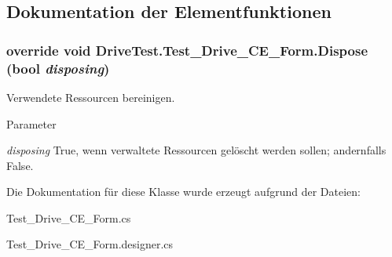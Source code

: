 \subsection{Dokumentation der Elementfunktionen}
\hypertarget{class_drive_test_1_1_test___drive___c_e___form_a584a1f5c6af489c5e76db7246edc3d7b}{
\subsubsection[{Dispose}]{\setlength{\rightskip}{0pt plus 5cm}override void DriveTest.Test\_\-Drive\_\-CE\_\-Form.Dispose (bool {\em disposing})}}
\label{class_drive_test_1_1_test___drive___c_e___form_a584a1f5c6af489c5e76db7246edc3d7b}


Verwendete Ressourcen bereinigen. 


\begin{DoxyParams}{Parameter}
\item[{\em disposing}]True, wenn verwaltete Ressourcen gelöscht werden sollen; andernfalls False.\end{DoxyParams}


Die Dokumentation für diese Klasse wurde erzeugt aufgrund der Dateien:\begin{DoxyCompactItemize}
\item 
Test\_\-Drive\_\-CE\_\-Form.cs\item 
Test\_\-Drive\_\-CE\_\-Form.designer.cs\end{DoxyCompactItemize}
